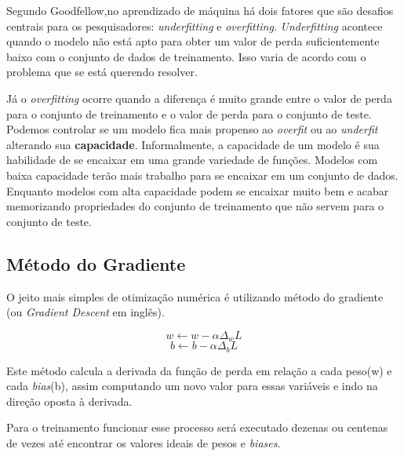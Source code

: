 Segundo Goodfellow\cite{Goodfellow-et-al-2016-Book},no aprendizado de
máquina há dois fatores que são desafios centrais para os
pesquisadores: \textit{underfitting} e
\textit{overfitting}. \textit{Underfitting} acontece quando o modelo
não está apto para obter um valor de perda suficientemente baixo com o
conjunto de dados de treinamento. Isso varia de acordo com o problema
que se está querendo resolver.

Já o \textit{overfitting} ocorre quando a diferença é muito grande
entre o valor de perda para o conjunto de treinamento e o valor de
perda para o conjunto de teste. Podemos controlar se um modelo fica
mais propenso ao \textit{overfit} ou ao \textit{underfit} alterando
sua {\bf capacidade}. Informalmente, a capacidade de um modelo é sua
habilidade de se encaixar em uma grande variedade de funções. Modelos
com baixa capacidade terão mais trabalho para se encaixar em um
conjunto de dados. Enquanto modelos com alta capacidade podem se
encaixar muito bem e acabar memorizando propriedades do conjunto de
treinamento que não servem para o conjunto de teste.

\subsection{Método do Gradiente}

O jeito mais simples de otimização numérica é utilizando método do
gradiente (ou \textit{Gradient Descent} em inglês).

\begin{equation}
  w \leftarrow w - \alpha \Delta_w L
\end{equation}
\begin{equation}
  b \leftarrow b - \alpha \Delta_b L
\end{equation}

Este método calcula a derivada da função de perda em relação a cada
peso(w) e cada \textit{bias}(b), assim computando um novo valor para
essas variáveis e indo na direção oposta à derivada.

Para o treinamento funcionar esse processo será executado dezenas ou
centenas de vezes até encontrar os valores ideais de pesos e
\textit{biases}.

